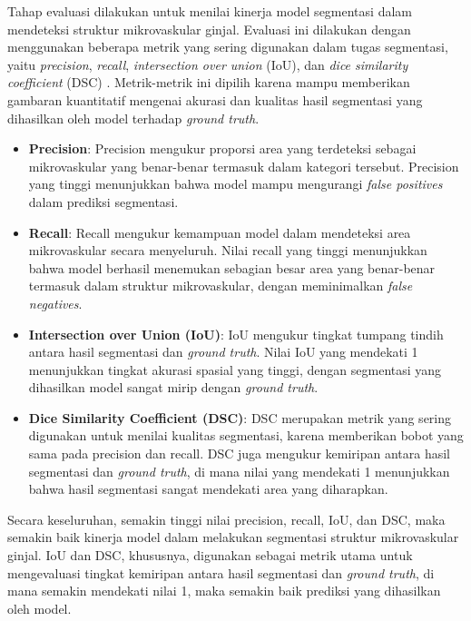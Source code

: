 \noindent Tahap evaluasi dilakukan untuk menilai kinerja model segmentasi dalam mendeteksi struktur mikrovaskular ginjal. Evaluasi ini dilakukan dengan menggunakan beberapa metrik yang sering digunakan dalam tugas segmentasi, yaitu \textit{precision}, \textit{recall}, \textit{intersection over union} (IoU), dan \textit{dice similarity coefficient} (DSC) \cite{jiang_iu-net_2023}. Metrik-metrik ini dipilih karena mampu memberikan gambaran kuantitatif mengenai akurasi dan kualitas hasil segmentasi yang dihasilkan oleh model terhadap \textit{ground truth}.

\begin{itemize}
	\item \textbf{Precision}: Precision mengukur proporsi area yang terdeteksi sebagai mikrovaskular yang benar-benar termasuk dalam kategori tersebut. Precision yang tinggi menunjukkan bahwa model mampu mengurangi \textit{false positives} dalam prediksi segmentasi.
	
	\item \textbf{Recall}: Recall mengukur kemampuan model dalam mendeteksi area mikrovaskular secara menyeluruh. Nilai recall yang tinggi menunjukkan bahwa model berhasil menemukan sebagian besar area yang benar-benar termasuk dalam struktur mikrovaskular, dengan meminimalkan \textit{false negatives}.
	
	\item \textbf{Intersection over Union (IoU)}: IoU mengukur tingkat tumpang tindih antara hasil segmentasi dan \textit{ground truth}. Nilai IoU yang mendekati 1 menunjukkan tingkat akurasi spasial yang tinggi, dengan segmentasi yang dihasilkan model sangat mirip dengan \textit{ground truth}.
	
	\item \textbf{Dice Similarity Coefficient (DSC)}: DSC merupakan metrik yang sering digunakan untuk menilai kualitas segmentasi, karena memberikan bobot yang sama pada precision dan recall. DSC juga mengukur kemiripan antara hasil segmentasi dan \textit{ground truth}, di mana nilai yang mendekati 1 menunjukkan bahwa hasil segmentasi sangat mendekati area yang diharapkan.
\end{itemize}

Secara keseluruhan, semakin tinggi nilai precision, recall, IoU, dan DSC, maka semakin baik kinerja model dalam melakukan segmentasi struktur mikrovaskular ginjal. IoU dan DSC, khususnya, digunakan sebagai metrik utama untuk mengevaluasi tingkat kemiripan antara hasil segmentasi dan \textit{ground truth}, di mana semakin mendekati nilai 1, maka semakin baik prediksi yang dihasilkan oleh model.

